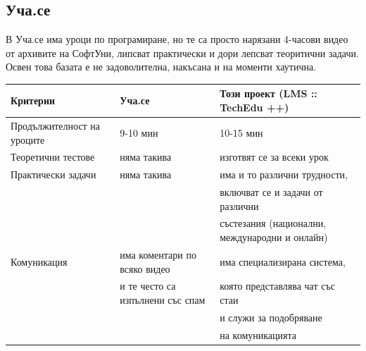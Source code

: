 \documentclass[12pt]{article}
\begin{document}
	\subsection{Уча.се}
	В Уча.се има уроци по програмиране, но те са просто нарязани 4-часови видео от архивите на СофтУни, липсват практически и дори лепсват теоритични задачи. Освен това базата е не задоволителна, накъсана и на моменти хаутична.
	\begin{table}[ht]
		\centering
		\resizebox{\textwidth}{!}
		{
			\begin{tabular}{l|l|l}
				Критерии & Уча.се & Този проект (LMS :: TechEdu ++)\\
				\hline
				Продължителност на уроците & 9-10 мин & 10-15 мин \\
				\hline
				Теоретични тестове & няма такива & изготвят се за всеки урок\\
				\hline
				Практически задачи & няма такива & има и то различни трудности,\\
				& & включват се и задачи от различни \\
				& & състезания (национални, международни и онлайн)\\
				\hline
				Комуникация & има коментари по всяко видео & има специализирана система,\\
				& и те често са изпълнени със спам & която представлява чат със стаи \\
				& & и служи за подобряване\\
				& & на комуникацията\\
				\hline
			\end{tabular}
		}
	\end{table}\\
\end{document}

